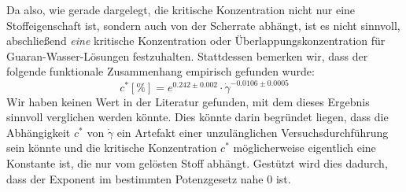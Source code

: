 \documentclass[11pt,a4paper,oneside]{scrartcl}
\begin{document}
Da also, wie gerade dargelegt, die kritische Konzentration nicht nur eine Stoffeigenschaft ist, sondern auch von der Scherrate abhängt, ist es nicht sinnvoll, abschließend \emph{eine} kritische Konzentration oder Überlappungskonzentration für Guaran-Wasser-Lösungen festzuhalten. Stattdessen bemerken wir, dass der folgende funktionale Zusammenhang empirisch gefunden wurde:
\begin{equation}
c^*[\%]=e^{0.242\pm0.002}\cdot\dot\gamma^{-0.0106\pm0.0005}
\end{equation}
Wir haben keinen Wert in der Literatur gefunden, mit dem dieses Ergebnis sinnvoll verglichen werden könnte. Dies könnte darin begründet liegen, dass 
die Abhängigkeit $c^*$ von $\dot\gamma$ ein Artefakt einer unzulänglichen Versuchsdurchführung sein könnte und die kritische Konzentration $c^*$ möglicherweise eigentlich eine Konstante ist, die nur vom gelösten Stoff abhängt. Gestützt wird dies dadurch, dass der Exponent im bestimmten Potenzgesetz nahe 0 ist. 



\end{document}
